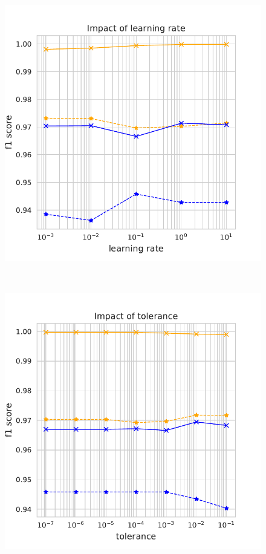 \documentclass[11pt]{article}
\begin{document}
\begin{figure}
\begin{minipage}[l]{0.3\textwidth}
\end{minipage}
\begin{minipage}[l]{0.3\textwidth}
\includegraphics[width=1\linewidth]{email_spam/perc_learning_rate.pdf}
\end{minipage}\\
\begin{minipage}[t]{0.3\textwidth}
\includegraphics[width=1\linewidth]{email_spam/perc_tolerance.pdf}

\end{minipage}
\end{figure}
\end{document}
